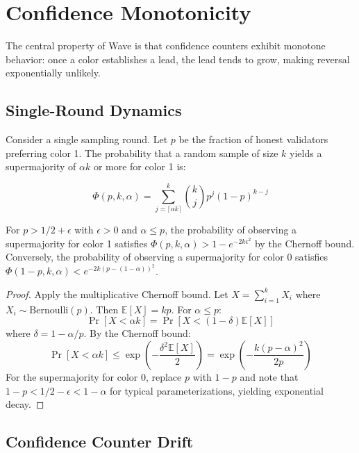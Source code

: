 \section{Confidence Monotonicity}

\label{sec:wave-analysis}

The central property of Wave is that confidence counters exhibit monotone behavior:
once a color establishes a lead, the lead tends to grow, making reversal exponentially
unlikely.

\subsection{Single-Round Dynamics}

Consider a single sampling round. Let $p$ be the fraction of honest validators
preferring color 1. The probability that a random sample of size $k$ yields a
supermajority of $\alpha k$ or more for color 1 is:

\begin{equation}
\Phi(p, k, \alpha) = \sum_{j = \lceil \alpha k \rceil}^{k} \binom{k}{j} p^j (1-p)^{k-j}
\label{eq:wave-supermajority}
\end{equation}

\begin{lemma}
\label{lem:wave-amplification}
For $p > 1/2 + \epsilon$ with $\epsilon > 0$ and $\alpha \leq p$, the probability of
observing a supermajority for color 1 satisfies $\Phi(p, k, \alpha) > 1 - e^{-2k\epsilon^2}$
by the Chernoff bound. Conversely, the probability of observing a supermajority for
color 0 satisfies $\Phi(1-p, k, \alpha) < e^{-2k(p - (1-\alpha))^2}$.
\end{lemma}

\begin{proof}
Apply the multiplicative Chernoff bound. Let $X = \sum_{i=1}^{k} X_i$ where $X_i \sim \text{Bernoulli}(p)$.
Then $\mathbb{E}[X] = kp$. For $\alpha \leq p$:
\[
\Pr[X < \alpha k] = \Pr[X < (1 - \delta)\mathbb{E}[X]]
\]
where $\delta = 1 - \alpha/p$. By the Chernoff bound:
\[
\Pr[X < \alpha k] \leq \exp\left(-\frac{\delta^2 \mathbb{E}[X]}{2}\right) = \exp\left(-\frac{k(p - \alpha)^2}{2p}\right)
\]
For the supermajority for color 0, replace $p$ with $1-p$ and note that $1-p < 1/2 - \epsilon < 1-\alpha$
for typical parameterizations, yielding exponential decay.
\end{proof}

\subsection{Confidence Counter Drift}

